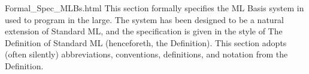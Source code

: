 
\newcommand{\mbb}[1]{\mathbb{#1}}
\newcommand{\mbf}[1]{\mathbf{#1}}
\renewcommand{\mit}[1]{\mathit{#1}}
\newcommand{\mrm}[1]{\mathrm{#1}}
\newcommand{\mtt}[1]{\mathtt{#1}}
\newcommand{\mcal}[1]{\mathcal{#1}}
\newcommand{\msf}[1]{\mathsf{#1}}

\newcommand{\ttt}[1]{\texttt{#1}}

\newenvironment{stackAux}[2]{%
\setlength{\arraycolsep}{0pt}
\begin{array}[#1]{#2}}{
\end{array}}
\newenvironment{stackCC}{
\begin{stackAux}{c}{c}}{\end{stackAux}}
\newenvironment{stackCL}{
\begin{stackAux}{c}{l}}{\end{stackAux}}
\newenvironment{stackTL}{
\begin{stackAux}{t}{l}}{\end{stackAux}}
\newenvironment{stackTR}{
\begin{stackAux}{t}{r}}{\end{stackAux}}
\newenvironment{stackBC}{
\begin{stackAux}{b}{c}}{\end{stackAux}}
\newenvironment{stackBL}{
\begin{stackAux}{b}{l}}{\end{stackAux}}

\newcommand{\stagger}[2]{%
\begin{array}{ccc}%
\multicolumn{2}{l}{#1}&\\%
&\multicolumn{2}{r}{#2}%
\end{array}}

\newcommand{\axiom}[1]{{\displaystyle\strut{#1}}}
\newcommand{\infrule}[2]{{\frac{\displaystyle\strut{#1}}{\displaystyle\strut{#2}}}} 
\newcommand{\judge}[2]{\infrule{#1}{#2}}


    {Formal_Spec_MLBs.html}
%
This section formally specifies the ML Basis system in {\mlton} used
to program in the large.  The system has been designed to be a natural
extension of Standard ML, and the specification is given in the style
of The Definition of Standard ML (henceforeth, the Definition).  This
section adopts (often silently) abbreviations, conventions,
definitions, and notation from the Definition.
%
